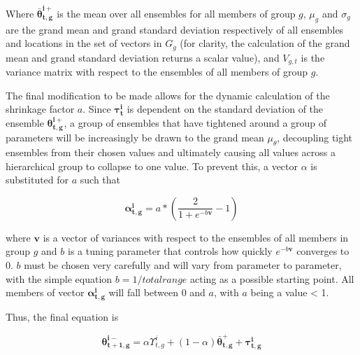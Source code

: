 Where $\mathbf{\bar{\theta}_{t,g}^{i+}}$ is the mean over all ensembles for all members of group $g$, $\mu_{g}$ and $\sigma_{g}$ are the grand mean and grand standard deviation respectively of all ensembles and locations in the set of vectors in $G_g$ (for clarity, the calculation of the grand mean and grand standard deviation returns a scalar value), and $V_{g,t}$ is the variance matrix with respect to the ensembles of all members of group $g$.

The final modification to be made allows for the dynamic calculation of the shrinkage factor $a$. Since $\mathbf{\tau_{t}^{i}}$ is dependent on the standard deviation of the ensemble $\mathbf{\theta_{t,g}^{i+}}$, a group of ensembles that have tightened around a group of parameters will be increasingly be drawn to the grand mean $\mu_{\theta}$, decoupling tight ensembles from their chosen values and ultimately causing all values across a hierarchical group to collapse to one value. To prevent this, a vector $\alpha$ is substituted for $a$ such that



\begin{equation}\label{eq:hdekf_new_alpha}
\mathbf{\alpha_{t,g}^{i}} = a * (\frac{2}{1+e^{-b\mathbf{v}}} - 1)
\end{equation}

where $\mathbf{v}$ is a vector of variances with respect to the ensembles of all members in group $g$ and $b$ is a tuning parameter that controls how quickly $e^{-b\mathbf{v}}$ converges to 0. $b$ must be chosen very carefully and will vary from parameter to parameter, with the simple equation $b = 1/totalrange$ acting as a possible starting point. All members of vector $\mathbf{\alpha_{t,g}^{i}}$ will fall between 0 and $a$, with $a$ being a value < 1.

Thus, the final equation is

\begin{equation}\label{eq:hdekf_theta_final}
\mathbf{\theta_{t+1,g}^{i-}} = \alpha \Upsilon_{t,g}^{i} + (1-\alpha)\mathbf{\bar{\theta}_{t,g}^{+}} + \mathbf{\tau_{t,g}^{i}}
\end{equation}

